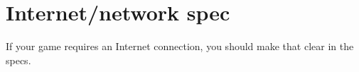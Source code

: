 \section{Internet/network spec} %
If your game requires an Internet connection, you should make that clear in the
specs.